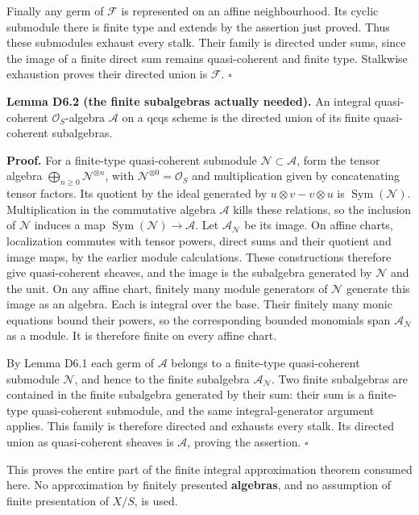 \documentclass[11pt,a4paper,openany]{report}
\begin{document}
Finally any germ of \(\mathcal F\) is represented on an affine neighbourhood. Its cyclic submodule there is finite type and extends by the assertion just proved. Thus these submodules exhaust every stalk. Their family is directed under sums, since the image of a finite direct sum remains quasi-coherent and finite type. Stalkwise exhaustion proves their directed union is \(\mathcal F\). \(\square\)

\textbf{Lemma D6.2 (the finite subalgebras actually needed).} An integral quasi-coherent \(\mathcal O_S\)-algebra \(\mathcal A\) on a qcqs scheme is the directed union of its finite quasi-coherent subalgebras.

\textbf{Proof.} For a finite-type quasi-coherent submodule \(\mathcal N\subset\mathcal A\), form the tensor algebra \(\bigoplus_{n\ge0}\mathcal N^{\otimes n}\), with \(\mathcal N^{\otimes0}=\mathcal O_S\) and multiplication given by concatenating tensor factors. Its quotient by the ideal generated by \(u\otimes v-v\otimes u\) is \(\operatorname{Sym}(\mathcal N)\). Multiplication in the commutative algebra \(\mathcal A\) kills these relations, so the inclusion of \(\mathcal N\) induces a map \(\operatorname{Sym}(\mathcal N)\to\mathcal A\). Let \(\mathcal A_{\mathcal N}\) be its image. On affine charts, localization commutes with tensor powers, direct sums and their quotient and image maps, by the earlier module calculations. These constructions therefore give quasi-coherent sheaves, and the image is the subalgebra generated by \(\mathcal N\) and the unit. On any affine chart, finitely many module generators of \(\mathcal N\) generate this image as an algebra. Each is integral over the base. Their finitely many monic equations bound their powers, so the corresponding bounded monomials span \(\mathcal A_{\mathcal N}\) as a module. It is therefore finite on every affine chart.

By Lemma D6.1 each germ of \(\mathcal A\) belongs to a finite-type quasi-coherent submodule \(\mathcal N\), and hence to the finite subalgebra \(\mathcal A_{\mathcal N}\). Two finite subalgebras are contained in the finite subalgebra generated by their sum: their sum is a finite-type quasi-coherent submodule, and the same integral-generator argument applies. This family is therefore directed and exhausts every stalk. Its directed union as quasi-coherent sheaves is \(\mathcal A\), proving the assertion. \(\square\)

This proves the entire part of the finite integral approximation theorem consumed here. No approximation by finitely presented \textbf{algebras}, and no assumption of finite presentation of \(X/S\), is used.
\end{document}
